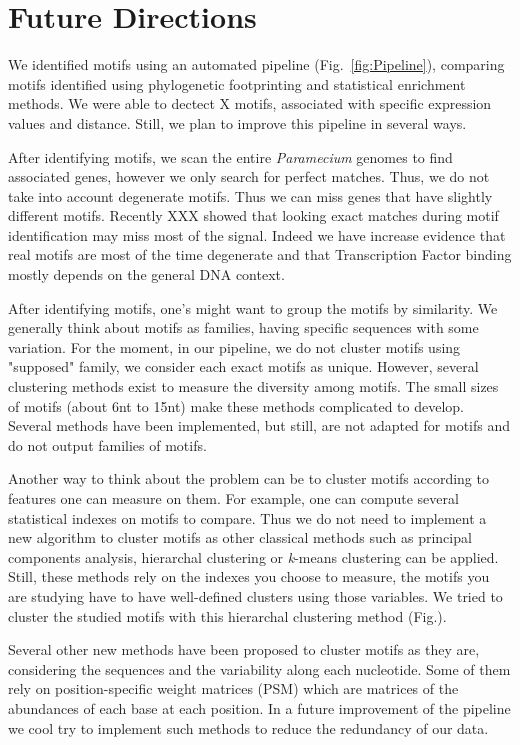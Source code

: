 \section*{Future Directions}

We identified motifs using an automated pipeline (Fig.~\ref{fig:Pipeline}), comparing motifs identified using phylogenetic footprinting and statistical enrichment methods. We were able to dectect X motifs, associated with specific expression values and distance. Still, we plan to improve this pipeline in several ways.

After identifying motifs, we scan the entire \textit{Paramecium} genomes to find associated genes, however we only search for perfect matches. Thus, we do not take into account degenerate motifs. Thus we can miss genes that have slightly different motifs. Recently XXX showed that looking exact matches during motif identification may miss most of the signal. Indeed we have increase evidence that real motifs are most of the time degenerate and that Transcription Factor binding mostly depends on the general DNA context.

After identifying motifs, one's might want to group the motifs by similarity. We generally think about motifs as families, having specific sequences with some variation. For the moment, in our pipeline, we do not cluster motifs using "supposed" family, we consider each exact motifs as unique. However, several clustering methods exist to measure the diversity among motifs. The small sizes of motifs (about 6nt to 15nt) make these methods complicated to develop. Several methods have been implemented, but still, are not adapted for motifs and do not output families of motifs. 

Another way to think about the problem can be to cluster motifs according to features one can measure on them. For example, one can compute several statistical indexes on motifs to compare. Thus we do not need to implement a new algorithm to cluster motifs as other classical methods such as principal components analysis, hierarchal clustering or \textit{k}-means clustering can be applied. Still, these methods rely on the indexes you choose to measure, the motifs you are studying have to have well-defined clusters using those variables. We tried to cluster the studied motifs with this hierarchal clustering method (Fig.).

Several other new methods have been proposed to cluster motifs as they are, considering the sequences and the variability along each nucleotide. Some of them rely on position-specific weight matrices (PSM) which are matrices of the abundances of each base at each position. In a future improvement of the pipeline we cool try to implement such methods to reduce the redundancy of our data.

